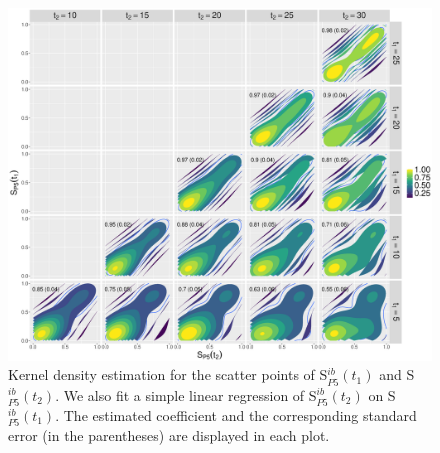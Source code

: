 \begin{refsection}
\begin{figure}[ht!]
    \centering
    \includegraphics[width=\textwidth]{figures/pred_power/scatter_autrp_all.eps}
    \caption[Kernel density estimation for the scatters of S$_{P5}(t_1)$ and S$_{P5}(t_2)$]{Kernel density estimation for the scatter points of S$_{P5}^{ib}(t_1)$ and S$_{P5}^{ib}(t_2)$. We also fit a simple linear regression of S$_{P5}^{ib}(t_2)$ on S$_{P5}^{ib}(t_1)$. The estimated coefficient and the corresponding standard error (in the parentheses) are displayed in each plot.}
    \label{fig:scatter_autrp_all}
\end{figure}



\end{refsection}
